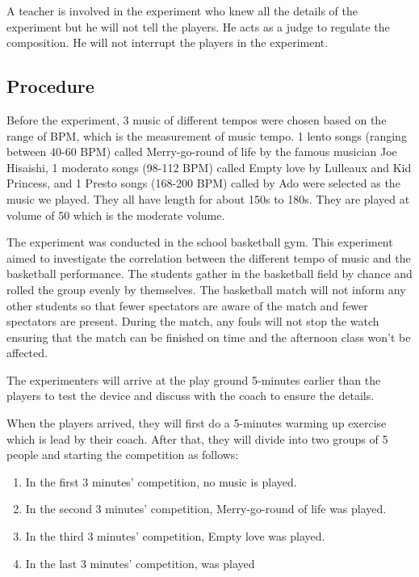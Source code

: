 \documentclass[man,floatsintext]{apa7}
\begin{document}
A teacher is involved in the experiment who knew all the details of the experiment but he will not tell the players. He acts as a judge to regulate the composition. He will not interrupt the players in the experiment. 

\subsection{Procedure}

Before the experiment, 3 music of different tempos were chosen based on the range of BPM, which is the measurement of music tempo. 1 lento songs (ranging between 40-60 BPM) called Merry-go-round of life by the famous musician Joe Hisaishi, 1 moderato songs (98-112 BPM) called Empty love by Lulleaux and Kid Princess, and 1 Presto songs (168-200 BPM) called  by Ado were selected as the music we played.\autocite{HelloMusicTheory2022} They all have length for about 150s to 180s. They are played at volume of 50 which is the moderate volume.

The experiment was conducted in the school basketball gym. This experiment aimed to investigate the correlation between the different tempo of music and the basketball performance. The students gather in the basketball field by chance and rolled the group evenly by themselves. The basketball match will not inform any other students so that fewer spectators are aware of the match and fewer spectators are present. During the match, any fouls will not stop the watch ensuring that the match can be finished on time and the afternoon class won't be affected.

The experimenters will arrive at the play ground 5-minutes earlier than the players to test the device and discuss with the coach to ensure the details. 

When the players arrived, they will first do a 5-minutes warming up exercise which is lead by their coach. After that, they will divide into two groups of 5 people and starting the competition as follows:

\begin{enumerate}
    \item In the first 3 minutes' competition, no music is played. 
    \item In the second 3 minutes' competition, Merry-go-round of life was played.
    \item In the third 3 minutes' competition, Empty love was played.
    \item In the last 3 minutes' competition,  was played
\end{enumerate}
\end{document}
